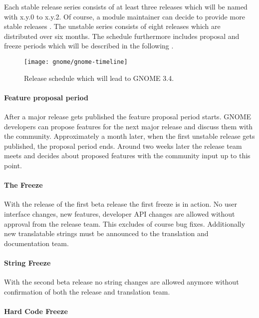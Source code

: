 Each stable release series consists of at least three releases which will be
named with x.y.0 to x.y.2. Of course, a module maintainer can decide to provide
more stable releases \cite{GNOMEReleaseTeam}. The unstable series consists of
eight releases which are distributed over six months. The schedule furthermore
includes proposal and freeze periods which will be described in the following
\cite{GNOMEDevelopmentSchedule,GNOMESchedule}.

\begin{figure}[htbp]
  \centering
  \texttt{[image: gnome/gnome-timeline]}
  \caption{Release schedule which will lead to GNOME 3.4.}
\end{figure}

\paragraph{Feature proposal period}

After a major release gets published the feature proposal period starts. GNOME
developers can propose features for the next major release and discuss them
with the community. Approximately a month later, when the first unstable
release gets published, the proposal period ends. Around two weeks later the
release team meets and decides about proposed features with the community input
up to this point.

\paragraph{The Freeze}

With the release of the first beta release the first freeze is in action. No
user interface changes, new features, developer API changes are allowed without
approval from the release team. This excludes of course bug fixes. Additionally
new translatable strings must be announced to the translation and documentation
team.

\paragraph{String Freeze}

With the second beta release no string changes are allowed anymore without
confirmation of both the release and translation team.

\paragraph{Hard Code Freeze}

